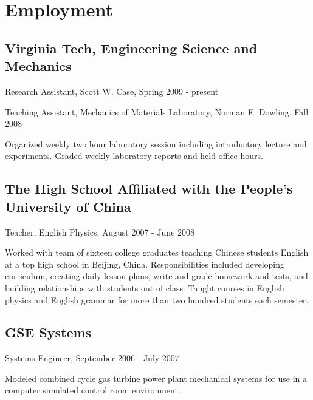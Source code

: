 \documentclass[10pt,letterpaper]{article}
\renewenvironment{itemize}{
  \begin{list}{}{
    \setlength{\leftmargin}{1.5em}
    \setlength{\itemsep}{0.25em}
    \setlength{\parskip}{0pt}
    \setlength{\parsep}{0.25em}
  }
}{
  \end{list}
}
\begin{document}
%
%

\section*{Employment}

\subsection*{Virginia Tech, Engineering Science and Mechanics}

\begin{itemize}
\item Research Assistant, Scott W. Case, Spring 2009 - present
\item Teaching Assistant, Mechanics of Materials Laboratory, Norman E. Dowling, Fall 2008
    \begin{itemize}
    \item Organized weekly two hour laboratory session including introductory lecture and experiments.  Graded weekly laboratory reports and held office hours.
    \end{itemize}
\end{itemize}

\subsection*{The High School Affiliated with the People's University of China}
\begin{itemize}
\item Teacher, English Physics, August 2007 - June 2008
    \begin{itemize}
    \item Worked with team of sixteen college graduates teaching Chinese students English at a top high school in Beijing, China.  Responsibilities included developing curriculum, creating daily lesson plans, write and grade homework and tests, and building relationships with students out of class.  Taught courses in English physics and English grammar for more than two hundred students each semester.
    \end{itemize}
\end{itemize}

\subsection*{GSE Systems}

\begin{itemize}
\item Systems Engineer, September 2006 - July 2007
    \begin{itemize}
    \item Modeled combined cycle gas turbine power plant mechanical systems for use in a computer simulated control room environment.
    \end{itemize}
\end{itemize}
\end{document}
